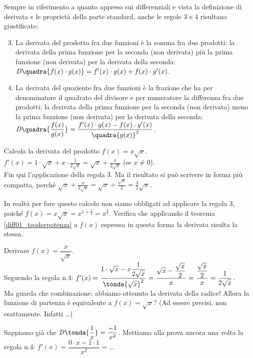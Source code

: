 Sempre in riferimento a quanto appreso sui differenziali 
e vista la definizione di derivata e le proprietà della parte standard, 
anche le regole 3 e 4 risultano giustificate:
\begin{enumerate}[noitemsep]
\setcounter{enumi}{2}
\item La derivata del prodotto fra due funzioni è la somma fra due prodotti:
la derivata della prima funzione per la seconda (non derivata) più la prima 
funzione (non derivata) per la derivata della seconda:\\
$\mathit{D}\quadra{f(x)\cdot g(x)}=f'(x)\cdot g(x)+f(x)\cdot g'(x)$.
\item La derivata del quoziente fra due funzioni è la frazione che ha per 
denominatore il quadrato del divisore e per numeratore la differenza fra due
prodotti: la derivata della prima funzione per la seconda (non derivata) 
meno
la prima funzione (non derivata) per la derivata della seconda:\\
$\mathit{D}\quadra{\dfrac{f(x)}{g(x)}}=\dfrac{f'(x)\cdot g(x)-f(x)\cdot 
g'(x)}
  {\quadra{g(x)}^2}$.
\end{enumerate} 

\begin{esempio}
  Calcola la derivata del prodotto $f(x)=x\sqrt{x}$.\\
  $f'(x)=1\cdot \sqrt{x}+x\cdot\frac{1}{2\sqrt{x}}=
  \sqrt{x}+\frac{x}{2\sqrt{x}}$ (se \(x\ne 0\)).\\
  Fin qui l'applicazione della regola 3. Ma il risultato si può scrivere 
  in forma più compatta, perché $\sqrt{x}+\frac{x}{2\sqrt{x}}=
  \sqrt{x}+\frac{\sqrt{x}}{2}=\frac{3}{2}\sqrt{x}$.
  \end{esempio}
\begin{osservazione}
  In realtà per fare questo calcolo non siamo obbligati ad applicare la regola 
  3, poiché $f(x)=x\sqrt{x}=x^{1+\frac{1}{2}}=x^{\frac{3}{2}}$. Verifica che 
  applicando il teorema \ref{diff01_teoderpotenza} a $f(x)$ espressa in questa 
  forma la derivata risulta la stessa.
 \end{osservazione}


\begin{esempio}
  Derivare $f(x)=\dfrac{x}{\sqrt{x}}$.\\
  Seguendo la regola n.4: $f'(x)= 
\dfrac{1\cdot\sqrt{x}-x\dfrac{1}{2\sqrt{x}}}
  {\tonda{\sqrt{x}}^2}=\dfrac{\sqrt{x}-\dfrac{\sqrt{x}}{2}}{x}=
  \dfrac{\dfrac{\sqrt{x}}{2}}{x}=\dfrac{1}{2\sqrt{x}}$.\\
  Ma guarda che combinazione: abbiamo ottenuto la derivata della radice! 
Allora la funzione di partenza è equivalente a $f(x)=\sqrt{x}$? (Ad essere 
precisi, 
non   esattamente. Infatti \dots)
\end{esempio}
\begin{esempio}
  Sappiamo già che $\mathit{D}\tonda{\dfrac{1}{x}}=\dfrac{-1}{x^2}$. 
  Mettiamo alla prova ancora una volta la regola n.4:
  $f'(x)=\dfrac{0\cdot x-1\cdot 1}{x^2}= \dots$
\end{esempio}


